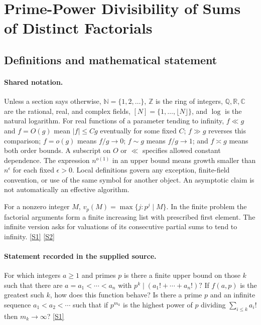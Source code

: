 \documentclass[11pt,a4paper]{article}
\newcommand{\N}{\mathbb{N}}
\newcommand{\Z}{\mathbb{Z}}
\newcommand{\Q}{\mathbb{Q}}
\newcommand{\R}{\mathbb{R}}
\newcommand{\C}{\mathbb{C}}
\newcommand{\sref}[2]{\hyperlink{source:#1:#2}{[S#2]}}
\begin{document}
\section{Prime-Power Divisibility of Sums of Distinct Factorials}\label{statement}


\subsection{Definitions and mathematical statement}

\paragraph{Shared notation.}Unless a section says otherwise, $\N=\{1,2,\ldots\}$,
$\Z$ is the ring of integers, $\Q,\R,\C$ are the rational, real, and complex
fields, $[N]=\{1,\ldots,\lfloor N\rfloor\}$, and $\log$ is the natural
logarithm. For real functions of a parameter tending to infinity,
$f\ll g$ and $f=O(g)$ mean $|f|\leq Cg$ eventually for some fixed $C$;
$f\gg g$ reverses this comparison; $f=o(g)$ means $f/g\to0$;
$f\sim g$ means $f/g\to1$; and $f\asymp g$ means both order bounds.
A subscript on $O$ or $\ll$ specifies allowed constant dependence.
The expression $n^{o(1)}$ in an upper bound means growth smaller than
$n^\epsilon$ for each fixed $\epsilon>0$. Local definitions govern any
exception, finite-field convention, or use of the same symbol for another
object. An asymptotic claim is not automatically an effective algorithm.



For a nonzero integer $M$, $v_p(M)=\max\{j:p^j\mid M\}$. In the finite problem the factorial arguments form a finite increasing list with prescribed first element. The infinite version asks for valuations of its consecutive partial sums to tend to infinity. \sref{statement}{1} \sref{statement}{2}

\paragraph{Statement recorded in the supplied source.}
For which integers $a\geq 1$ and primes $p$ is there a finite upper bound on those $k$ such that there are $a=a_1<\cdots<a_n$ with $ p^k \mid (a_1!+\cdots+a_n!)? $ If $f(a,p)$ is the greatest such $k$, how does this function behave?
Is there a prime $p$ and an infinite sequence $a_1<a_2<\cdots$ such that if $p^{m_k}$ is the highest power of $p$ dividing $\sum_{i\leq k}a_i!$ then $m_k\to \infty$? \sref{statement}{1}
\end{document}
